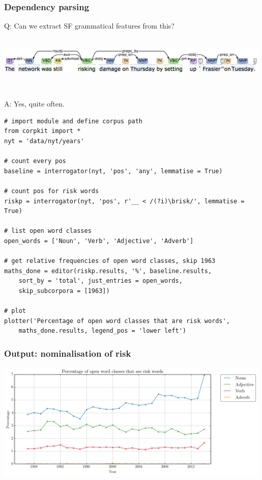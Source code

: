 \documentclass{beamer}       %
\begin{document}

\begin{frame}
    \frametitle{Dependency parsing}

    Q: Can we extract SF grammatical features from this? 

    ~\\

    \centering
    \includegraphics[width=0.99\textwidth]{../images/depparse}

    ~\\
    
    \raggedright
    A: Yes, quite often.
\end{frame}


\begin{frame}[fragile]
    \begin{verbatim}
# import module and define corpus path
from corpkit import *
nyt = 'data/nyt/years'

# count every pos
baseline = interrogator(nyt, 'pos', 'any', lemmatise = True)

# count pos for risk words
riskp = interrogator(nyt, 'pos', r'__ < /(?i)\brisk/', lemmatise = True)

# list open word classes
open_words = ['Noun', 'Verb', 'Adjective', 'Adverb']

# get relative frequencies of open word classes, skip 1963
maths_done = editor(riskp.results, '%', baseline.results, 
    sort_by = 'total', just_entries = open_words, 
    skip_subcorpora = [1963])

# plot
plotter('Percentage of open word classes that are risk words', 
    maths_done.results, legend_pos = 'lower left')
    \end{verbatim}
\end{frame}

\begin{frame}
    \frametitle{Output: nominalisation of risk}
    \centering
    \includegraphics[width=0.99\textwidth]{../images/percentage-of-open-word-classes-that-are-risk-words}
\end{frame}
\end{document}
